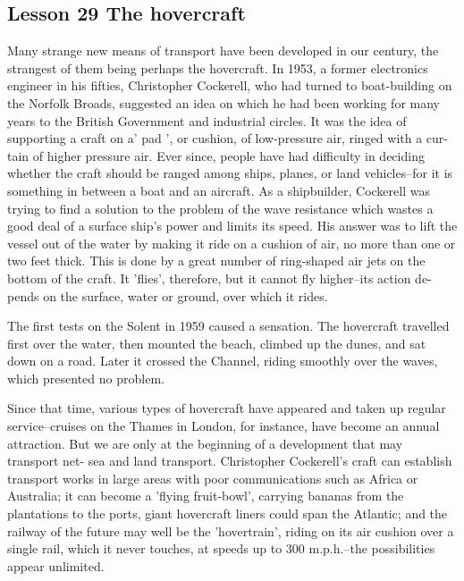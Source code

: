 \documentclass[kindlepaper]{BHCexam4kindle}
\begin{document}
\subsection{Lesson 29
The hovercraft}
\par
Many strange new means of transport have been developed in our century, the
strangest of them being perhaps the hovercraft. In 1953, a former electronics
engineer in his fifties, Christopher Cockerell, who had turned to boat-building
on the Norfolk Broads, suggested an idea on which he had been working for
many years to the British Government and industrial circles. It was the idea of
supporting a craft on a' pad ', or cushion, of low-pressure air, ringed with a cur-
tain of higher pressure air. Ever since, people have had difficulty in deciding
whether the craft should be ranged among ships, planes, or land vehicles--for it
is something in between a boat and an aircraft. As a shipbuilder, Cockerell was
trying to find a solution to the problem of the wave resistance which wastes a good
deal of a surface ship's power and limits its speed. His answer was to lift the
vessel out of the water by making it ride on a cushion of air, no more than one or
two feet thick. This is done by a great number of ring-shaped air jets on the
bottom of the craft. It 'flies', therefore, but it cannot fly higher--its action de-
pends on the surface, water or ground, over which it rides.
\par
The first tests on the Solent in 1959 caused a sensation. The hovercraft
travelled first over the water, then mounted the beach, climbed up the dunes,
and sat down on a road. Later it crossed the Channel, riding smoothly over the
waves, which presented no problem.
\par
Since that time, various types of hovercraft have appeared and taken up regular
service--cruises on the Thames in London, for instance, have become an annual
attraction. But we are only at the beginning of a development that may transport net-
sea and land transport. Christopher Cockerell's craft can establish transport
works in large areas with poor communications such as Africa or Australia; it
can become a 'flying fruit-bowl', carrying bananas from the plantations to the
ports, giant hovercraft liners could span the Atlantic; and the railway of the
future may well be the 'hovertrain', riding on its air cushion over a single rail,
which it never touches, at speeds up to 300 m.p.h.--the possibilities appear
unlimited.
\clearpage
\end{document}
